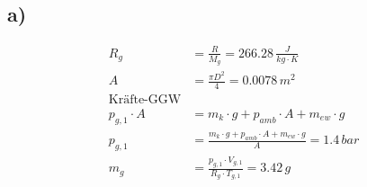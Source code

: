 

\subsection*{a)}
\begin{align*}
R_g &= \frac{R}{M_g} = 266.28 \, \frac{J}{kg \cdot K} \\
A &= \frac{\pi D^2}{4} = 0.0078 \, m^2 \\
\text{Kräfte-GGW} \\
p_{g,1} \cdot A &= m_k \cdot g + p_{amb} \cdot A + m_{ew} \cdot g \\
p_{g,1} &= \frac{m_k \cdot g + p_{amb} \cdot A + m_{ew} \cdot g}{A} = 1.4 \, bar \\
m_g &= \frac{p_{g,1} \cdot V_{g,1}}{R_g \cdot T_{g,1}} = 3.42 \, g
\end{align*}
